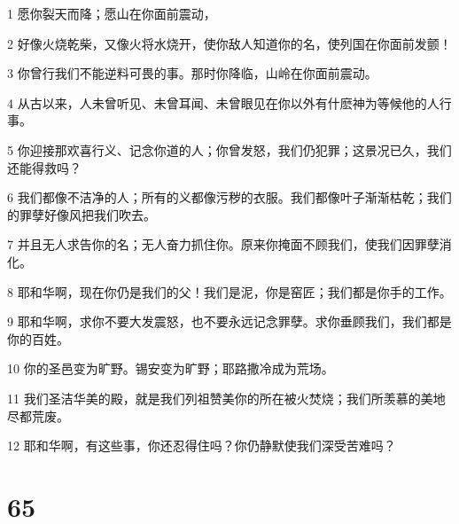 \par 1 愿你裂天而降；愿山在你面前震动，
\par 2 好像火烧乾柴，又像火将水烧开，使你敌人知道你的名，使列国在你面前发颤！
\par 3 你曾行我们不能逆料可畏的事。那时你降临，山岭在你面前震动。
\par 4 从古以来，人未曾听见、未曾耳闻、未曾眼见在你以外有什麽神为等候他的人行事。
\par 5 你迎接那欢喜行义、记念你道的人；你曾发怒，我们仍犯罪；这景况已久，我们还能得救吗？
\par 6 我们都像不洁净的人；所有的义都像污秽的衣服。我们都像叶子渐渐枯乾；我们的罪孽好像风把我们吹去。
\par 7 并且无人求告你的名；无人奋力抓住你。原来你掩面不顾我们，使我们因罪孽消化。
\par 8 耶和华啊，现在你仍是我们的父！我们是泥，你是窑匠；我们都是你手的工作。
\par 9 耶和华啊，求你不要大发震怒，也不要永远记念罪孽。求你垂顾我们，我们都是你的百姓。
\par 10 你的圣邑变为旷野。锡安变为旷野；耶路撒冷成为荒场。
\par 11 我们圣洁华美的殿，就是我们列祖赞美你的所在被火焚烧；我们所羡慕的美地尽都荒废。
\par 12 耶和华啊，有这些事，你还忍得住吗？你仍静默使我们深受苦难吗？

\chapter{65}

